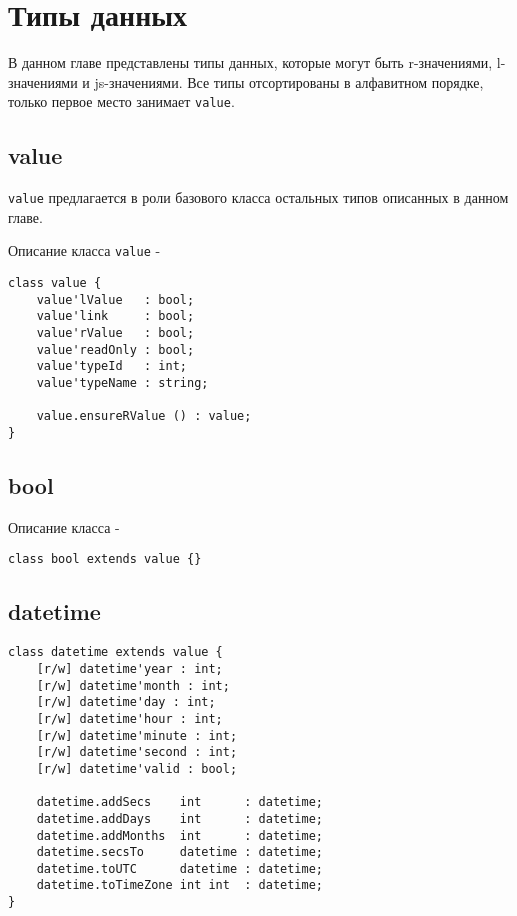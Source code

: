 

\section{Типы данных}

В данном главе представлены типы данных, которые могут быть r-значениями, l-значениями и js-значениями. Все типы отсортированы в алфавитном порядке, только первое место занимает \texttt{value}.

\subsection{{\color{lightblue} value}}

\texttt{value} предлагается в роли базового класса остальных типов описанных в данном главе.

\noindent Описание класса \texttt{value} -
\begin{verbatim}
class value {
    value'lValue   : bool;
    value'link     : bool;
    value'rValue   : bool;
    value'readOnly : bool;
    value'typeId   : int;
    value'typeName : string;

    value.ensureRValue () : value;
}
\end{verbatim}

\subsection{{\color{lightblue} bool}}

\noindent Описание класса \bool -
\begin{verbatim}
class bool extends value {}
\end{verbatim}

\subsection{{\color{lightblue} datetime}}

\begin{verbatim}
class datetime extends value {
	[r/w] datetime'year : int;
	[r/w] datetime'month : int;
	[r/w] datetime'day : int;
	[r/w] datetime'hour : int;
	[r/w] datetime'minute : int;
	[r/w] datetime'second : int;
	[r/w] datetime'valid : bool;
	
	datetime.addSecs    int      : datetime;
	datetime.addDays    int      : datetime;
	datetime.addMonths  int      : datetime;
	datetime.secsTo     datetime : datetime;
	datetime.toUTC      datetime : datetime;
	datetime.toTimeZone int int  : datetime;
}
\end{verbatim}


